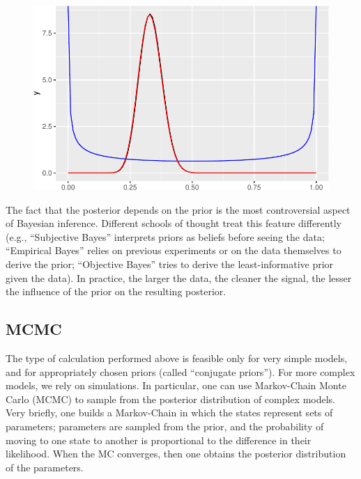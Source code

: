 \documentclass[
  letterpaper,
  DIV=11,
  numbers=noendperiod]{scrreprt}
\begin{document}
\begin{figure}[H]

{\centering \includegraphics{./06-likelihood_files/figure-pdf/unnamed-chunk-7-1.pdf}

}

\end{figure}

The fact that the posterior depends on the prior is the most
controversial aspect of Bayesian inference. Different schools of thought
treat this feature differently (e.g., ``Subjective Bayes'' interprets
priors as beliefs before seeing the data; ``Empirical Bayes'' relies on
previous experiments or on the data themselves to derive the prior;
``Objective Bayes'' tries to derive the least-informative prior given
the data). In practice, the larger the data, the cleaner the signal, the
lesser the influence of the prior on the resulting posterior.

\hypertarget{mcmc}{%
\subsection{MCMC}\label{mcmc}}

The type of calculation performed above is feasible only for very simple
models, and for appropriately chosen priors (called ``conjugate
priors''). For more complex models, we rely on simulations. In
particular, one can use Markov-Chain Monte Carlo (MCMC) to sample from
the posterior distribution of complex models. Very briefly, one builds a
Markov-Chain in which the states represent sets of parameters;
parameters are sampled from the prior, and the probability of moving to
one state to another is proportional to the difference in their
likelihood. When the MC converges, then one obtains the posterior
distribution of the parameters.
\end{document}
